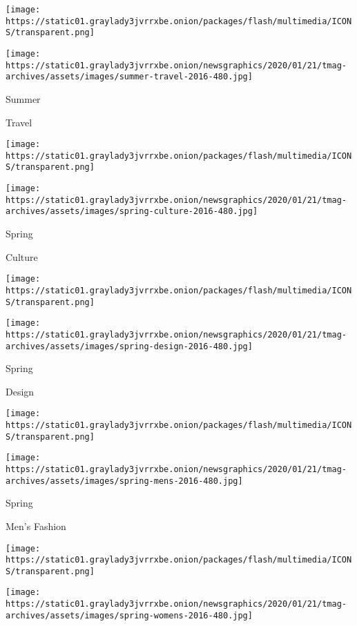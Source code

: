 \href{https://www.nytimes3xbfgragh.onion/issue/t-magazine/2016/05/22/travel}{}

\texttt{[image: https://static01.graylady3jvrrxbe.onion/packages/flash/multimedia/ICONS/transparent.png]}

\texttt{[image: https://static01.graylady3jvrrxbe.onion/newsgraphics/2020/01/21/tmag-archives/assets/images/summer-travel-2016-480.jpg]}

Summer

Travel

\href{https://www.nytimes3xbfgragh.onion/issue/t-magazine/2016/04/17/culture}{}

\texttt{[image: https://static01.graylady3jvrrxbe.onion/packages/flash/multimedia/ICONS/transparent.png]}

\texttt{[image: https://static01.graylady3jvrrxbe.onion/newsgraphics/2020/01/21/tmag-archives/assets/images/spring-culture-2016-480.jpg]}

Spring

Culture

\href{https://www.nytimes3xbfgragh.onion/issue/t-magazine/design/2016/03/20/t-design}{}

\texttt{[image: https://static01.graylady3jvrrxbe.onion/packages/flash/multimedia/ICONS/transparent.png]}

\texttt{[image: https://static01.graylady3jvrrxbe.onion/newsgraphics/2020/01/21/tmag-archives/assets/images/spring-design-2016-480.jpg]}

Spring

Design

\href{https://www.nytimes3xbfgragh.onion/issue/t-magazine/2016/03/06/men-spring-fashion}{}

\texttt{[image: https://static01.graylady3jvrrxbe.onion/packages/flash/multimedia/ICONS/transparent.png]}

\texttt{[image: https://static01.graylady3jvrrxbe.onion/newsgraphics/2020/01/21/tmag-archives/assets/images/spring-mens-2016-480.jpg]}

Spring

Men's Fashion

\href{https://www.nytimes3xbfgragh.onion/issue/t-magazine/2016/02/14/womens-fashion}{}

\texttt{[image: https://static01.graylady3jvrrxbe.onion/packages/flash/multimedia/ICONS/transparent.png]}

\texttt{[image: https://static01.graylady3jvrrxbe.onion/newsgraphics/2020/01/21/tmag-archives/assets/images/spring-womens-2016-480.jpg]}

